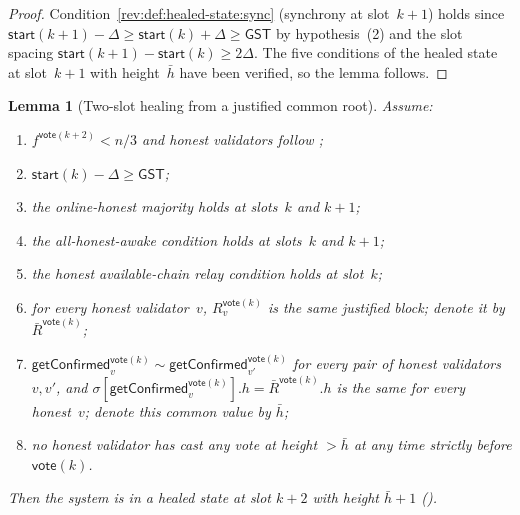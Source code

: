\documentclass{article}
\newcommand{\start}{\mathsf{start}}
\newcommand{\vote}{\mathsf{vote}}
\newcommand{\comm}[1]{\bar{#1}}
\newcommand{\getConfirmed}{\textsf{getConfirmed}\xspace}
\theoremstyle{plain}
\newtheorem{lemma}{Lemma}
\theoremstyle{definition}
\theoremstyle{remark}
\newcommand{\GST}{\ensuremath{\mathsf{GST}}}
\newcommand{\OHM}{online-honest majority\xspace}
\newcommand{\HAR}{honest available-chain relay\xspace}
\newcommand{\AHA}{all-honest-awake\xspace}
\begin{document}
\begin{proof}
Condition~\ref{rev:def:healed-state:sync} (synchrony at slot~$k+1$) holds since $\start(k+1) - \Delta \geq \start(k) + \Delta \geq \GST$ by hypothesis~(2) and the slot spacing $\start(k+1) - \start(k) \geq 2\Delta$. The five conditions of the healed state at slot~$k+1$ with height~$\comm{h}$ have been verified, so the lemma follows.
\end{proof}


\begin{lemma}[Two-slot healing from a justified common root]\label{rev:lem:healing-from-justified}
Assume:
\begin{enumerate}
  \item $f^{\vote(k+2)} < n/3$ and honest validators follow ;
  \item $\start(k) - \Delta \geq \GST$;
  \item the \OHM holds at slots~$k$ and $k+1$;
  \item the \AHA condition holds at slots~$k$ and $k+1$;
  \item the \HAR condition holds at slot~$k$;
  \item for every honest validator~$v$, $R_v^{\vote(k)}$ is the same justified block; denote it by $\comm{R}^{\vote(k)}$;
  \item $\getConfirmed_v^{\vote(k)} \sim \getConfirmed_{v'}^{\vote(k)}$ for every pair of honest validators~$v, v'$, and $\sigma[\getConfirmed_v^{\vote(k)}].h = \comm{R}^{\vote(k)}.h$ is the same for every honest~$v$; denote this common value by $\comm{h}$;
  \item no honest validator has cast any vote at height $> \comm{h}$ at any time strictly before $\vote(k)$.
\end{enumerate}
Then the system is in a healed state at slot $k+2$ with height $\comm{h}+1$ ().
\end{lemma}
\end{document}
